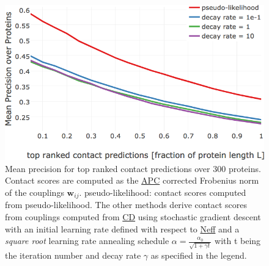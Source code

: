 \documentclass[11pt,a4paper,twoside]{book}
\newcommand{\wij}{\mathbf{w}_{ij}}
\theoremstyle{definition}
\theoremstyle{definition}
\theoremstyle{remark}
\begin{document}
\begin{figure}

{\centering \includegraphics[width=0.85\linewidth]{img/full_likelihood/appendix/precision_vs_rank_alpha0_0_sqrt_decayrate} 

}

\caption{Mean precision for top ranked
contact predictions over 300 proteins. Contact scores are computed as
the \protect\hyperlink{abbrev}{APC} corrected Frobenius norm of the
couplings \(\wij\). pseudo-likelihood: contact scores computed from
pseudo-likelihood. The other methods derive contact scores from
couplings computed from \protect\hyperlink{abbrev}{CD} using stochastic
gradient descent with an initial learning rate defined with respect to
\protect\hyperlink{abbrev}{Neff} and a \emph{square root} learning rate
annealing schedule \(\alpha = \frac{\alpha_0}{\sqrt{1 + \gamma t}}\)
with t being the iteration number and decay rate \(\gamma\) as specified
in the legend.}\label{fig:performance-cd-sqrtschedule}
\end{figure}
\end{document}
